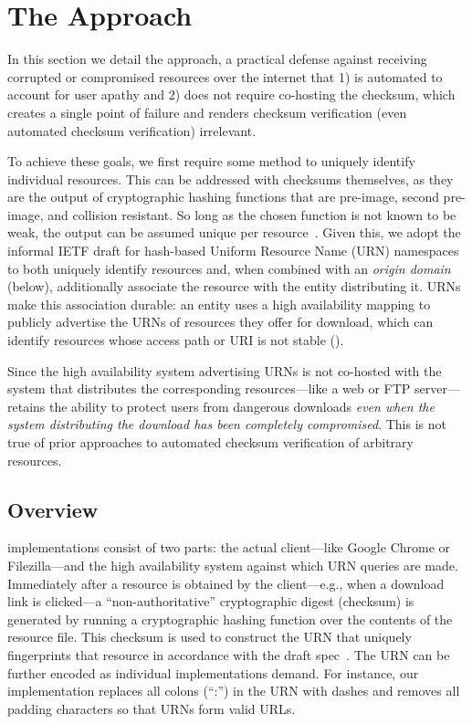 \section{The \SYSTEM{} Approach} \label{sec:approach}

In this section we detail the \SYSTEM{} approach, a practical defense against
receiving corrupted or compromised resources over the internet that 1) is
automated to account for user apathy and 2) does not require co-hosting the
checksum, which creates a single point of failure and renders checksum
verification (even automated checksum verification) irrelevant.

To achieve these goals, we first require some method to uniquely identify
individual resources. This can be addressed with checksums themselves, as they
are the output of cryptographic hashing functions that are pre-image, second
pre-image, and collision resistant. So long as the chosen function is not known
to be weak, the output can be assumed unique per resource~\cite{Rogaway}. Given
this, we adopt the informal IETF draft for hash-based Uniform Resource Name
(URN) namespaces~\cite{draft-URN} to both uniquely identify resources and, when
combined with an \emph{origin domain} (below), additionally associate the
resource with the entity distributing it. URNs make this association durable: an
entity uses a high availability mapping to publicly advertise the URNs of
resources they offer for download, which can identify resources whose access
path or URI is not stable ().

Since the high availability system advertising URNs is not co-hosted with the
system that distributes the corresponding resources---like a web or FTP
server---\SYSTEM{} retains the ability to protect users from dangerous downloads
\emph{even when the system distributing the download has been completely
compromised}. This is not true of prior approaches to automated checksum
verification of arbitrary resources. 

\subsection{Overview}

\SYSTEM{} implementations consist of two parts: the actual client---like Google
Chrome or Filezilla---and the high availability system against which URN queries
are made. Immediately after a resource is obtained by the client---e.g., when a
download link is clicked---a ``non-authoritative'' cryptographic digest
(checksum) is generated by running a cryptographic hashing function over the
contents of the resource file. This checksum is used to construct the URN that
uniquely fingerprints that resource in accordance with the draft
spec~\cite{draft-URN}. The URN can be further encoded as individual
implementations demand. For instance, our \DNSSYS{} implementation replaces all
colons (``:'') in the URN with dashes and removes all padding characters so that
URNs form valid URLs.

